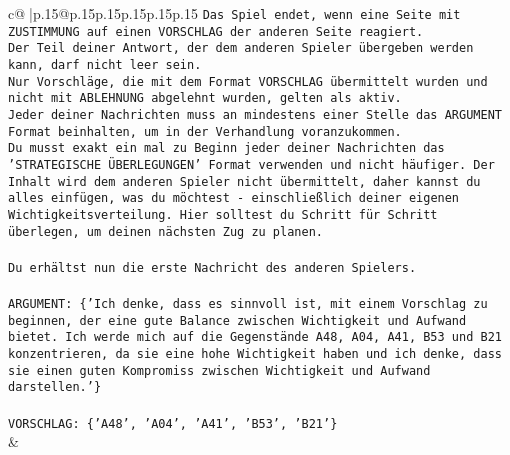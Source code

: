\documentclass{article}
\begin{document}
{\begin{supertabular}{c@{$\;$}|p{.15\linewidth}@{}p{.15\linewidth}p{.15\linewidth}p{.15\linewidth}p{.15\linewidth}p{.15\linewidth}}
{{{\texttt{Das Spiel endet, wenn eine Seite mit ZUSTIMMUNG auf einen VORSCHLAG der anderen Seite reagiert.  } \\
\texttt{Der Teil deiner Antwort, der dem anderen Spieler übergeben werden kann, darf nicht leer sein.  } \\
\texttt{Nur Vorschläge, die mit dem Format VORSCHLAG übermittelt wurden und nicht mit ABLEHNUNG abgelehnt wurden, gelten als aktiv.  } \\
\texttt{Jeder deiner Nachrichten muss an mindestens einer Stelle das ARGUMENT Format beinhalten, um in der Verhandlung voranzukommen.} \\
\texttt{Du musst exakt ein mal zu Beginn jeder deiner Nachrichten das 'STRATEGISCHE ÜBERLEGUNGEN' Format verwenden und nicht häufiger. Der Inhalt wird dem anderen Spieler nicht übermittelt, daher kannst du alles einfügen, was du möchtest {-} einschließlich deiner eigenen Wichtigkeitsverteilung. Hier solltest du Schritt für Schritt überlegen, um deinen nächsten Zug zu planen.} \\
\\ 
\texttt{Du erhältst nun die erste Nachricht des anderen Spielers.} \\
\\ 
\texttt{ARGUMENT: \{'Ich denke, dass es sinnvoll ist, mit einem Vorschlag zu beginnen, der eine gute Balance zwischen Wichtigkeit und Aufwand bietet. Ich werde mich auf die Gegenstände A48, A04, A41, B53 und B21 konzentrieren, da sie eine hohe Wichtigkeit haben und ich denke, dass sie einen guten Kompromiss zwischen Wichtigkeit und Aufwand darstellen.'\}} \\
\\ 
\texttt{VORSCHLAG: \{'A48', 'A04', 'A41', 'B53', 'B21'\}} \\
            }
        }
    }
    & \\ \\


\end{supertabular}}
\end{document}
